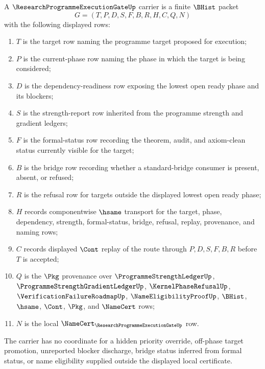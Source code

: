\begin{definition}
\label{def:research-programme-execution-gate-carrier}
A $\ResearchProgrammeExecutionGateUp$ carrier is a finite $\BHist$ packet
$$
G=(T,P,D,S,F,B,R,H,C,Q,N)
$$
with the following displayed rows:
\begin{enumerate}
\item $T$ is the target row naming the programme target proposed for execution;
\item $P$ is the current-phase row naming the phase in which the target is being considered;
\item $D$ is the dependency-readiness row exposing the lowest open ready phase and its blockers;
\item $S$ is the strength-report row inherited from the programme strength and gradient ledgers;
\item $F$ is the formal-status row recording the theorem, audit, and axiom-clean status currently visible for the target;
\item $B$ is the bridge row recording whether a standard-bridge consumer is present, absent, or refused;
\item $R$ is the refusal row for targets outside the displayed lowest open ready phase;
\item $H$ records componentwise $\hsame$ transport for the target, phase, dependency, strength, formal-status, bridge, refusal, replay, provenance, and naming rows;
\item $C$ records displayed $\Cont$ replay of the route through $P,D,S,F,B,R$ before $T$ is accepted;
\item $Q$ is the $\Pkg$ provenance over $\ProgrammeStrengthLedgerUp$, $\ProgrammeStrengthGradientLedgerUp$, $\KernelPhaseRefusalUp$, $\VerificationFailureRoadmapUp$, $\NameEligibilityProofUp$, $\BHist$, $\hsame$, $\Cont$, $\Pkg$, and $\NameCert$ rows;
\item $N$ is the local $\NameCert_{\ResearchProgrammeExecutionGateUp}$ row.
\end{enumerate}
The carrier has no coordinate for a hidden priority override, off-phase target promotion, unreported blocker discharge, bridge status inferred from formal status, or name eligibility supplied outside the displayed local certificate.
\end{definition}

